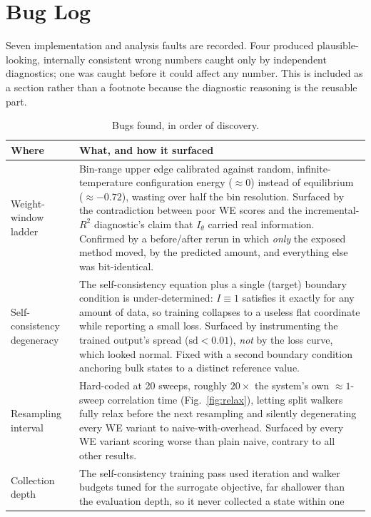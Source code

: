 \documentclass[11pt,a4paper]{article}
\begin{document}
\section{Bug Log}

Seven implementation and analysis faults are recorded. Four produced plausible-looking, internally
consistent wrong numbers caught only by independent diagnostics; one was caught before it could
affect any number. This is included as a section rather than a footnote because the diagnostic
reasoning is the reusable part.

\begin{table}[H]\centering\small
\caption{Bugs found, in order of discovery.}
\begin{tabular}{p{2.5cm}p{11.6cm}}\toprule
\textbf{Where} & \textbf{What, and how it surfaced}\\\midrule
Weight-window ladder &
Bin-range upper edge calibrated against random, infinite-temperature configuration energy
($\approx0$) instead of equilibrium ($\approx-0.72$), wasting over half the bin resolution.
Surfaced by the contradiction between poor WE scores and the incremental-$R^2$ diagnostic's
claim that $I_\theta$ carried real information. Confirmed by a before/after rerun in which
\emph{only} the exposed method moved, by the predicted amount, and everything else was
bit-identical.\\\midrule
Self-consistency degeneracy &
The self-consistency equation plus a single (target) boundary condition is under-determined:
$I\equiv1$ satisfies it exactly for any amount of data, so training collapses to a useless flat
coordinate while reporting a small loss. Surfaced by instrumenting the trained output's spread
($\mathrm{sd}<0.01$), \emph{not} by the loss curve, which looked normal. Fixed with a second
boundary condition anchoring bulk states to a distinct reference value.\\\midrule
Resampling interval &
Hard-coded at 20 sweeps, roughly $20\times$ the system's own $\approx1$-sweep correlation time
(Fig.~\ref{fig:relax}), letting split walkers fully relax before the next resampling and silently
degenerating every WE variant to naive-with-overhead. Surfaced by every WE variant scoring worse
than plain naive, contrary to all other results.\\\midrule
Collection depth &
The self-consistency training pass used iteration and walker budgets tuned for the surrogate
objective, far shallower than the evaluation depth, so it never collected a state within one

\end{tabular}
\end{table}
\end{document}
